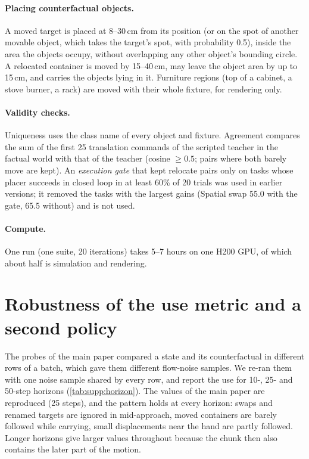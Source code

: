 \paragraph{Placing counterfactual objects.}
A moved target is placed at 8--30\,cm from its position (or on the spot of another movable object, which takes the
target's spot, with probability 0.5), inside the area the objects occupy, without overlapping any other object's bounding
circle. A relocated container is moved by 15--40\,cm, may leave the object area by up to 15\,cm, and carries the objects
lying in it. Furniture regions (top of a cabinet, a stove burner, a rack) are moved with their whole fixture, for rendering
only.

\paragraph{Validity checks.}
Uniqueness uses the class name of every object and fixture. Agreement compares the sum of the first 25 translation commands
of the scripted teacher in the factual world with that of the \pizf teacher (cosine $\geq 0.5$; pairs where both barely
move are kept). An \emph{execution gate} that kept relocate pairs only on tasks whose placer succeeds in closed loop in at
least 60\% of 20 trials was used in earlier versions; it removed the tasks with the largest gains (\eg Spatial swap 55.0
with the gate, 65.5 without) and is not used.

\paragraph{Compute.}
One run (one suite, 20 iterations) takes 5--7 hours on one H200 GPU, of which about half is simulation and rendering.

\section{Robustness of the use metric and a second policy}
\label{sec:supp:probe}

The probes of the main paper compared a state and its counterfactual in different rows of a batch, which gave them
different flow-noise samples. We re-ran them with one noise sample shared by every row, and report the use for 10-, 25- and
50-step horizons (\cref{tab:supp:horizon}). The values of the main paper are reproduced (25 steps), and the pattern holds
at every horizon: swaps and renamed targets are ignored in mid-approach, moved containers are barely followed while
carrying, small displacements near the hand are partly followed. Longer horizons give larger values throughout because the
chunk then also contains the later part of the motion.

